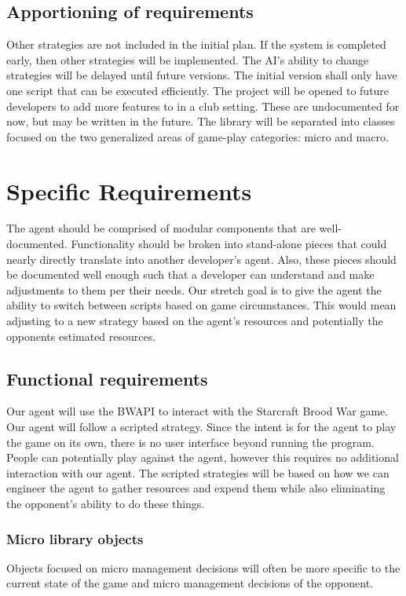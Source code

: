\subsection{Apportioning of requirements}
Other strategies are not included in the initial plan. If the system is completed early, then other strategies will be implemented.
The AI's ability to change strategies will be delayed until future versions. The initial version shall only have one script that can be executed efficiently.
The project will be opened to future developers to add more features to in a club setting. These are undocumented for now, but may be written in the future. The library will be separated into classes focused on the two generalized areas of game-play categories: micro and macro.



\newpage

\section{Specific Requirements}
The agent should be comprised of modular components that are well-documented. Functionality should be broken into stand-alone pieces that could nearly directly translate into another developer's agent. Also, these pieces should be documented well enough such that a developer can understand and make adjustments to them per their needs. Our stretch goal is to give the agent the ability to switch between scripts based on game circumstances. This would mean adjusting to a new strategy based on the agent's resources and potentially the opponents estimated resources.

\subsection{Functional requirements}
Our agent will use the BWAPI to interact with the Starcraft Brood War game. Our agent will follow a scripted strategy. Since the intent is for the agent to play the game on its own, there is no user interface beyond running the program. People can potentially play against the agent, however this requires no additional interaction with our agent. The scripted strategies will be based on how we can engineer the agent to gather resources and expend them while also eliminating the opponent's ability to do these things.
\vspace{5mm}

\subsubsection{Micro library objects}
Objects focused on micro management decisions will often be more specific to the current state of the game and micro management decisions of the opponent.

